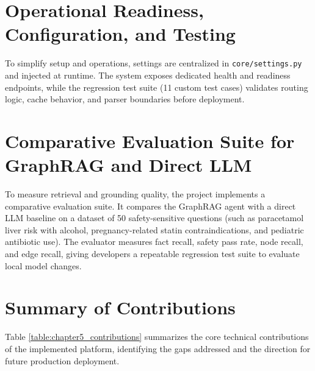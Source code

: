 \documentclass[../main.tex]{subfiles}
\begin{document}
\section{Operational Readiness, Configuration, and Testing}
To simplify setup and operations, settings are centralized in \texttt{core/settings.py} and injected at runtime. The system exposes dedicated health and readiness endpoints, while the regression test suite (11 custom test cases) validates routing logic, cache behavior, and parser boundaries before deployment.

\section{Comparative Evaluation Suite for GraphRAG and Direct LLM}
To measure retrieval and grounding quality, the project implements a comparative evaluation suite. It compares the GraphRAG agent with a direct LLM baseline on a dataset of 50 safety-sensitive questions (such as paracetamol liver risk with alcohol, pregnancy-related statin contraindications, and pediatric antibiotic use). The evaluator measures fact recall, safety pass rate, node recall, and edge recall, giving developers a repeatable regression test suite to evaluate local model changes.

\section{Summary of Contributions}
Table \ref{table:chapter5_contributions} summarizes the core technical contributions of the implemented platform, identifying the gaps addressed and the direction for future production deployment.
\end{document}
